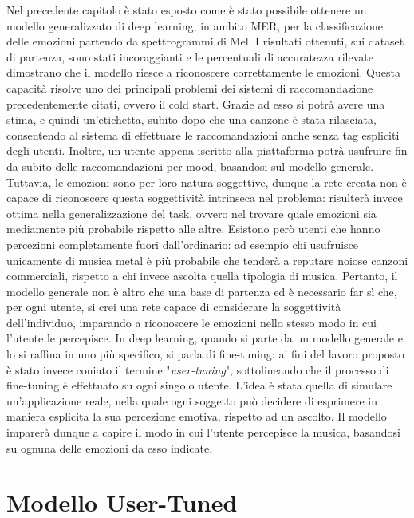 \documentclass[11pt]{report}
\begin{document}
Nel precedente capitolo è stato esposto come è stato possibile ottenere un modello generalizzato di deep learning, in ambito MER, per la classificazione delle emozioni partendo da spettrogrammi di Mel. I risultati ottenuti, sui dataset di partenza, sono stati incoraggianti e le percentuali di accuratezza rilevate dimostrano che il modello riesce a riconoscere correttamente le emozioni. Questa capacità risolve uno dei principali problemi dei sistemi di raccomandazione precedentemente citati, ovvero il cold start. Grazie ad esso si potrà avere una stima, e quindi un'etichetta, subito dopo che una canzone è stata rilasciata, consentendo al sistema di effettuare le raccomandazioni anche senza tag espliciti degli utenti. Inoltre, un utente appena iscritto alla piattaforma potrà usufruire fin da subito delle raccomandazioni per mood, basandosi sul modello generale. Tuttavia, le emozioni sono per loro natura soggettive, dunque la rete creata non è capace di riconoscere questa soggettività intrinseca nel problema: risulterà invece ottima nella generalizzazione del task, ovvero nel trovare quale emozioni sia mediamente più probabile rispetto alle altre. Esistono però utenti che hanno percezioni completamente fuori dall'ordinario: ad esempio chi usufruisce unicamente di musica metal è più probabile che tenderà a reputare noiose canzoni commerciali, rispetto a chi invece ascolta quella tipologia di musica. Pertanto, il modello generale non è altro che una base di partenza ed è necessario far sì che, per ogni utente, si crei una rete capace di considerare la soggettività dell'individuo, imparando a riconoscere le emozioni nello stesso modo in cui l'utente le percepisce. In deep learning, quando si parte da un modello generale e lo si raffina in uno più specifico, si parla di fine-tuning: ai fini del lavoro proposto è stato invece coniato il termine "\textit{user-tuning}", sottolineando che il processo di fine-tuning è effettuato su ogni singolo utente. L'idea è stata quella di simulare un'applicazione reale, nella quale ogni soggetto può decidere di esprimere in maniera esplicita la sua percezione emotiva, rispetto ad un ascolto. Il modello imparerà dunque a capire il modo in cui l'utente percepisce la musica, basandosi su ognuna delle emozioni da esso indicate. 

\newpage


\section{Modello User-Tuned}
\end{document}

